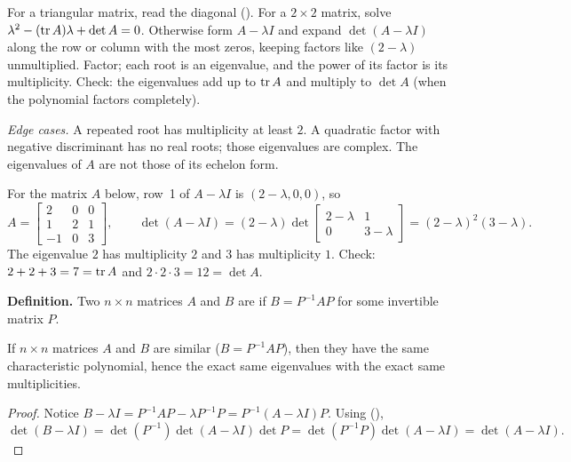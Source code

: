 \documentclass[10pt]{scrartcl}
\begin{document}
\begin{steps}
  \ii For a triangular matrix, read the diagonal ().
  \ii For a $2\times2$ matrix, solve $\lambda^2-(\operatorname{tr} A)\lambda+\det A=0$.
  \ii Otherwise form $A-\lambda I$ and expand $\det(A-\lambda I)$ along the row or column with the most zeros, keeping factors like $(2-\lambda)$ unmultiplied.
  \ii Factor; each root is an eigenvalue, and the power of its factor is its multiplicity. Check: the eigenvalues add up to $\operatorname{tr} A$ and multiply to $\det A$ (when the polynomial factors completely).
\end{steps}
\emph{Edge cases.} A repeated root has multiplicity at least $2$. A quadratic factor with negative discriminant has no real roots; those eigenvalues are complex. The eigenvalues of $A$ are not those of its echelon form.

\begin{example*}
For the matrix $A$ below, row~1 of $A-\lambda I$ is $(2-\lambda,0,0)$, so
\[
  A=\begin{bmatrix}2&0&0\\1&2&1\\-1&0&3\end{bmatrix},\qquad
  \det(A-\lambda I)=(2-\lambda)\det\begin{bmatrix}2-\lambda&1\\0&3-\lambda\end{bmatrix}=(2-\lambda)^2(3-\lambda).
\]
The eigenvalue $2$ has multiplicity $2$ and $3$ has multiplicity $1$. Check: $2+2+3=7=\operatorname{tr} A$ and $2\cdot2\cdot3=12=\det A$.
\end{example*}

\noindent\textbf{Definition.} Two $n\times n$ matrices $A$ and $B$ are  if $B=P^{-1}AP$ for some invertible matrix $P$.

\begin{theorem*}
  If $n\times n$ matrices $A$ and $B$ are similar ($B=P^{-1}AP$), then they have the same characteristic polynomial, hence the exact same eigenvalues with the exact same multiplicities.
\end{theorem*}
\begin{proof}
  Notice $B-\lambda I = P^{-1}AP - \lambda P^{-1}P = P^{-1}(A-\lambda I)P$. Using (),
  \[
    \det(B-\lambda I) = \det(P^{-1})\det(A-\lambda I)\det P = \det(P^{-1}P)\det(A-\lambda I) = \det(A-\lambda I).
  \]
\end{proof}
\end{document}
